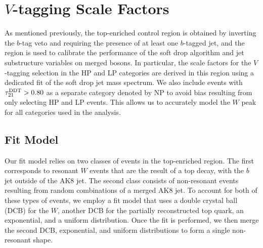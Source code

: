 
\section{$V$-tagging Scale Factors}
\label{sec:vTag}

As mentioned previously, the top-enriched control region is obtained by inverting the $b$-tag veto and requiring the presence of at least one $b$-tagged jet, and the region is used to calibrate the performance of the soft drop algorithm and jet substructure variables on merged bosons.
In particular, the scale factors for the $V$-tagging selection in the HP and LP categories are derived in this region using a dedicated fit of the soft drop jet mass spectrum.
We also include events with $\tau_{21}^\mathrm{DDT}>0.80$ as a separate category denoted by NP to avoid bias resulting from only selecting HP and LP events.
This allows us to accurately model the $W$ peak for all categories used in the analysis.

\subsection{Fit Model}

Our fit model relies on two classes of events in the top-enriched region.
The first corresponds to resonant $W$ events that are the result of a top decay, with the $b$ jet outside of the AK8 jet.
The second class consists of non-resonant events resulting from random combinations of a merged AK8 jet.
To account for both of these types of events, we employ a fit model that uses a double crystal ball (DCB) for the $W$, another DCB for the partially reconstructed top quark, an exponential, and a uniform distribution.
Once the fit is performed, we then merge the second DCB, exponential, and uniform distributions to form a single non-resonant shape.


